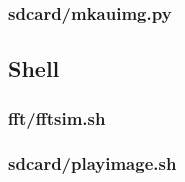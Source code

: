\documentclass{article}
\begin{document}
	\subsubsection{sdcard/mkauimg.py}
	

\subsection{Shell}
	\subsubsection{fft/fftsim.sh}
	
	\subsubsection{sdcard/playimage.sh}
	
 
\end{document}
